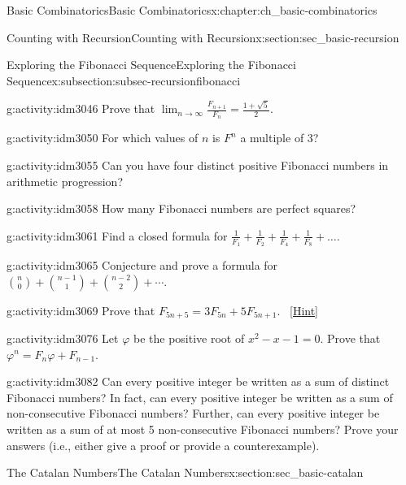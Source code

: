 \documentclass[oneside,10pt,]{book}
\numberwithin{equation}{chapter}
\begin{document}
\begin{chapterptx}{Basic Combinatorics}{}{Basic Combinatorics}{}{}{x:chapter:ch_basic-combinatorics}
\begin{sectionptx}{Counting with Recursion}{}{Counting with Recursion}{}{}{x:section:sec_basic-recursion}
\begin{subsectionptx}{Exploring the Fibonacci Sequence}{}{Exploring the Fibonacci Sequence}{}{}{x:subsection:subsec-recursionfibonacci}
\begin{activity}{}{g:activity:idm3046}%
Prove that \(\lim_{n\to\infty}\frac{F_{n + 1}}{F_{n}} = \frac{1 + \sqrt{5}}{2}.\)%
\end{activity}
\begin{activity}{}{g:activity:idm3050}%
For which values of \(n\) is \(F^{n}\) a multiple of 3?%
\end{activity}
\begin{activity}{}{g:activity:idm3055}%
Can you have four distinct positive Fibonacci numbers in arithmetic progression?%
\end{activity}
\begin{activity}{}{g:activity:idm3058}%
How many Fibonacci numbers are perfect squares?%
\end{activity}
\begin{activity}{}{g:activity:idm3061}%
Find a closed formula for \(\frac{1}{F_{1}} + \frac{1}{F_{2}} + \frac{1}{F_{4}} + \frac{1}{F_{8}} + \ldots.\)%
\end{activity}
\begin{activity}{}{g:activity:idm3065}%
Conjecture and prove a formula for \(\binom{n}{0} + \binom{n-1}{1} + \binom{n-2}{2} + \cdots\).%
\end{activity}
\begin{activity}{}{g:activity:idm3069}%
Prove that \(F_{5n + 5} = 3F_{5n} + 5F_{5n + 1}\).%
\qquad~\hfill{\tiny\hyperlink{g:hint:idm3073-back}{[Hint]}}\end{activity}
\begin{activity}{}{g:activity:idm3076}%
Let \(\varphi\) be the positive root of \(x^{2} - x - 1 = 0\). Prove that \(\varphi^{n} = F_{n}\varphi + F_{n - 1}\).%
\end{activity}
\begin{activity}{}{g:activity:idm3082}%
Can every positive integer be written as a sum of distinct Fibonacci numbers?  In fact, can every positive integer be written as a sum of non-consecutive Fibonacci numbers?  Further, can every positive integer be written as a sum of at most 5 non-consecutive Fibonacci numbers?  Prove your answers (i.e., either give a proof or provide a counterexample).%
\end{activity}
\end{subsectionptx}
\end{sectionptx}
%
%
\typeout{************************************************}
\typeout{************************************************}
%
\begin{sectionptx}{The Catalan Numbers}{}{The Catalan Numbers}{}{}{x:section:sec_basic-catalan}

\end{sectionptx}
\end{chapterptx}
\end{document}
